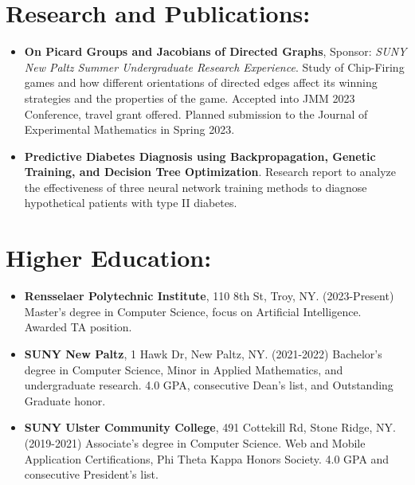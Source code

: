 \documentclass[11pt]{article}
\begin{document}
    \section*{Research and Publications:}
    \begin{itemize}
        \itemsep0em
        \item \textbf{On Picard Groups and Jacobians of Directed Graphs}, 
            Sponsor: \textit{SUNY New Paltz Summer Undergraduate Research Experience}. 
            Study of Chip-Firing games and how different orientations of directed edges affect its 
            winning strategies and the properties of the game.  Accepted into JMM 2023 Conference, travel 
            grant offered.  Planned submission to the Journal of Experimental Mathematics in Spring 2023.
        \item \textbf{Predictive Diabetes Diagnosis using Backpropagation, Genetic Training, and Decision 
            Tree Optimization}. Research report to analyze the effectiveness of three neural network 
            training methods to diagnose hypothetical patients with type II diabetes.
    \end{itemize}

    \section*{Higher Education:}
    \begin{itemize}
        \itemsep0em
        \item \textbf{Rensselaer Polytechnic Institute}, 110 8th St, Troy, NY. (2023-Present) 
        Master's degree in Computer Science, focus on Artificial Intelligence.  Awarded TA position.
        \item \textbf{SUNY New Paltz}, 1 Hawk Dr, New Paltz, NY. (2021-2022) Bachelor's degree in 
            Computer Science, Minor in Applied Mathematics, and undergraduate research. 4.0 GPA, 
            consecutive Dean's list, and Outstanding Graduate honor.
        \item \textbf{SUNY Ulster Community College}, 491 Cottekill Rd, Stone Ridge, NY. (2019-2021) 
            Associate's degree in Computer Science. Web and Mobile Application Certifications, 
            Phi Theta Kappa Honors Society. 4.0 GPA and consecutive President's list.
    \end{itemize}
\end{document}
